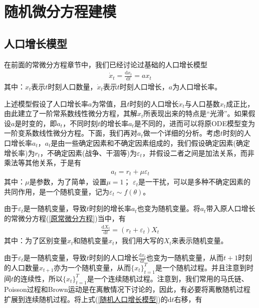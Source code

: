 \section{随机微分方程建模}
    \label{sec:随机微分方程建模}
    \subsection{人口增长模型}
        \label{subsec:人口增长模型}
        \par
        在前面的常微分方程章节中，我们已经讨论过基础的人口增长模型
        \begin{align}
            \label{原常微分方程}
            \dot{x}_t = \frac{\mathrm{d}x_t}{\mathrm{d}t} = a x_t
        \end{align}
        其中：$x_t$表示$t$时刻人口数量，$\dot{x}_t$表示$t$时刻人口增长，$a$为人口增长率。
        \par
        上述模型假设了人口增长率$a$为常值，且$t$时刻的人口增长$\dot{x}_t$与人口基数$x_t$成正比，由此建立了一阶常系数线性微分方程，其解$x_t$所表现出来的特点是“光滑”。如果假设$a$是时变的，即$a_t$，不同时刻$t$的增长率$a_t$是不同的，进而可以将原ODE模型变为一阶变系数线性微分方程。下面，我们再对$a_t$做一个详细的分析。考虑$t$时刻的人口增长率$a_t$，$a_t$是由一些确定因素和不确定因素组成的，我们假设确定因素(确定增长率)为$r_t$，不确定因素(战争、干涸等)为$\varepsilon_t$，并假设二者之间是加法关系，而非乘法等其他关系，于是有
        \begin{align*}
            a_t = r_t+\mu \varepsilon_t
        \end{align*}
        其中：$\mu $是参数，为了简单，设置$\mu = 1$； $\varepsilon_t$是一干扰，可以是多种不确定因素的共同作用，是一个随机变量，记为$\varepsilon_t \sim f(\theta )$。
        \par
        由于$\varepsilon_t$是一随机变量，导致$t$时刻的增长率$a_t$也变为随机变量。将$a_t$带入原人口增长的常微分方程(\ref{原常微分方程})当中，有
        \begin{align}
            \label{随机人口增长模型}
            \frac{\mathrm{d}X_t}{\mathrm{d}t} = (r_t+\varepsilon_t)X_t
        \end{align}
        其中：为了区别变量$x_t$和随机变量$x_t$，我们用大写的$X_t$来表示随机变量。
        \par
        由于$\varepsilon_t$是一随机变量，导致$t$时刻的人口增长$\frac{\mathrm{d}x_t}{\mathrm{d}t}$也变为一随机变量，从而$t+1$时刻的人口数量$x_{t+1}$亦为一个随机变量，从而$\{x_t\}_{t = 1}^T$是一个随机过程。并且注意到时间$t$的连续性，所以$\{x_t\}_{t = 1}^T$是一个连续随机过程。注意到，我们常用的马氏链、Poisson过程和Brown运动是在离散情况下讨论的，因此，有必要将离散随机过程扩展到连续随机过程。将上式(\ref{随机人口增长模型})的$\mathrm{d}t$右移，有
